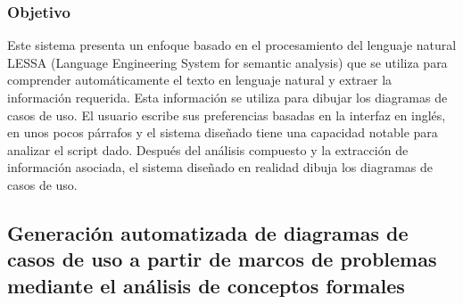 \subsubsection{Objetivo}
Este sistema presenta un enfoque basado en el procesamiento del lenguaje natural LESSA (Language Engineering System for semantic analysis) que se utiliza para comprender automáticamente el texto en lenguaje natural y extraer la información requerida. Esta información se utiliza para dibujar los diagramas de casos de uso. El usuario escribe sus preferencias basadas en la interfaz en inglés, en unos pocos párrafos y el sistema diseñado tiene una capacidad notable para analizar el script dado. Después del análisis compuesto y la extracción de información asociada, el sistema diseñado en realidad dibuja los diagramas de casos de uso. 

\subsection{Generación automatizada de diagramas de casos de uso a partir de marcos de problemas mediante el análisis de conceptos formales}




%
%



